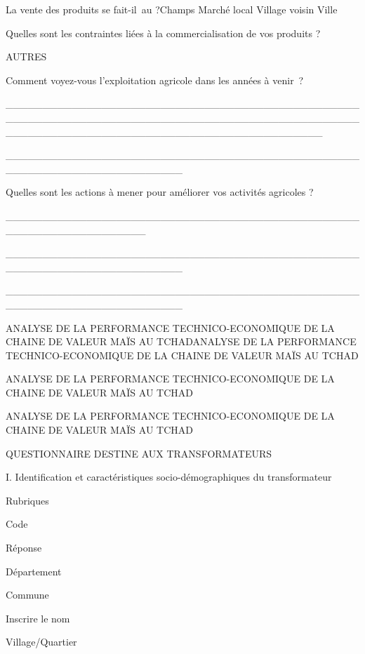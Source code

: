 \documentclass[12pt,oneside]{report}
\begin{document}
La vente des produits se fait-il au ?Champs         Marché local  Village voisin                      Ville

Quelles sont les contraintes liées à la commercialisation de vos produits ?

AUTRES

Comment voyez-vous l’exploitation agricole dans les années à venir ?

\_\_\_\_\_\_\_\_\_\_\_\_\_\_\_\_\_\_\_\_\_\_\_\_\_\_\_\_\_\_\_\_\_\_\_\_\_\_\_\_\_\_\_\_\_\_\_\_\_\_\_\_\_\_\_\_\_\_\_\_\_\_\_\_\_\_\_\_\_\_\_\_\_\_\_\_\_\_\_\_\_\_\_\_\_\_\_\_\_\_\_\_\_\_\_\_\_\_\_\_\_\_\_\_\_\_\_\_\_\_\_\_\_\_\_\_\_\_\_\_\_\_\_\_\_\_\_\_\_\_\_\_\_\_\_\_\_\_\_

\_\_\_\_\_\_\_\_\_\_\_\_\_\_\_\_\_\_\_\_\_\_\_\_\_\_\_\_\_\_\_\_\_\_\_\_\_\_\_\_\_\_\_\_\_\_\_\_\_\_\_\_\_\_\_\_\_\_\_\_\_\_\_\_\_\_\_\_\_\_\_\_

Quelles sont les actions à mener pour améliorer vos activités agricoles ?

\_\_\_\_\_\_\_\_\_\_\_\_\_\_\_\_\_\_\_\_\_\_\_\_\_\_\_\_\_\_\_\_\_\_\_\_\_\_\_\_\_\_\_\_\_\_\_\_\_\_\_\_\_\_\_\_\_\_\_\_\_\_\_\_\_\_\_

\_\_\_\_\_\_\_\_\_\_\_\_\_\_\_\_\_\_\_\_\_\_\_\_\_\_\_\_\_\_\_\_\_\_\_\_\_\_\_\_\_\_\_\_\_\_\_\_\_\_\_\_\_\_\_\_\_\_\_\_\_\_\_\_\_\_\_\_\_\_\_\_

\_\_\_\_\_\_\_\_\_\_\_\_\_\_\_\_\_\_\_\_\_\_\_\_\_\_\_\_\_\_\_\_\_\_\_\_\_\_\_\_\_\_\_\_\_\_\_\_\_\_\_\_\_\_\_\_\_\_\_\_\_\_\_\_\_\_\_\_\_\_\_\_

ANALYSE DE LA PERFORMANCE TECHNICO-ECONOMIQUE DE LA CHAINE DE VALEUR  MAÏS AU TCHADANALYSE DE LA PERFORMANCE TECHNICO-ECONOMIQUE DE LA CHAINE DE VALEUR  MAÏS AU TCHAD

ANALYSE DE LA PERFORMANCE TECHNICO-ECONOMIQUE DE LA CHAINE DE VALEUR  MAÏS AU TCHAD

ANALYSE DE LA PERFORMANCE TECHNICO-ECONOMIQUE DE LA CHAINE DE VALEUR  MAÏS AU TCHAD

QUESTIONNAIRE DESTINE AUX TRANSFORMATEURS

I. Identification et caractéristiques socio-démographiques du transformateur

Rubriques

Code

Réponse

Département

Commune

Inscrire le nom

Village/Quartier
\end{document}
